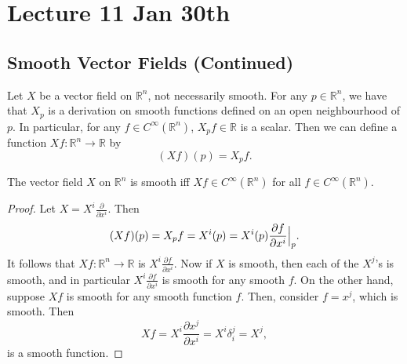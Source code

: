 \documentclass[notoc,notitlepage]{tufte-book}
\begin{document}


\chapter{Lecture 11 Jan 30th}%
\label{chp:lecture_11_jan_30th}

\section{Smooth Vector Fields (Continued)}%
\label{sec:smooth_vector_fields_continued}

Let $X$ be a vector field on $\mathbb{R}^n$, not necessarily smooth. For any $p \in \mathbb{R}^n$,
we have that $X_p$ is a derivation on smooth functions defined on an open neighbourhood of $p$.
In particular, for any $f \in C^\infty(\mathbb{R}^n)$, $X_p f \in \mathbb{R}$ is a scalar. Then
we can define a function $X f : \mathbb{R}^n \to \mathbb{R}$ by
\begin{equation*}
  (X f)(p) = X_p f.
\end{equation*}

\begin{propo}\label{propo:equivalent_definition_of_a_smooth_vector_field}
  The vector field $X$ on $\mathbb{R}^n$ is smooth iff $X f \in C^\infty(\mathbb{R}^n)$ for all
  $f \in C^\infty(\mathbb{R}^n)$.
\end{propo}

\begin{proof}
  Let $X = X^i \frac{\partial}{\partial x^i}$. Then
  \begin{equation*}
    (Xf)(p) = X_p f = X^i(p) = X^i (p) \frac{\partial f}{\partial x^i} \Big|_{p}^{}.
  \end{equation*}
  It follows that $Xf : \mathbb{R}^n \to \mathbb{R}$ is $X^i \frac{\partial f}{\partial x^i}$.
  Now if $X$ is smooth, then each of the $X^j$'s is smooth, and in particular
  $X^i \frac{\partial f}{\partial x^i}$ is smooth for any smooth $f$. On the other hand, suppose
  $Xf$ is smooth for any smooth function $f$. Then, consider $f = x^j$, which is smooth. Then
  \begin{equation*}
    Xf = X^i \frac{\partial x^j}{\partial x^i} = X^i \delta_i^j = X^j,
  \end{equation*}
  is a smooth function.
\end{proof}
\end{document}
